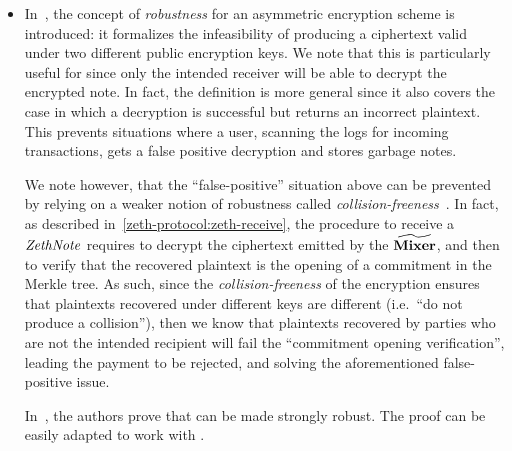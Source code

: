 \begin{itemize}
    \item In~\cite{abdalla2010robust}, the concept of \emph{robustness} for an asymmetric encryption scheme is introduced: it formalizes the infeasibility of producing a ciphertext valid under two different public encryption keys. We note that this is particularly useful for \zeth{} since only the intended receiver will be able to decrypt the encrypted note. In fact, the definition is more general since it also covers the case in which a decryption is successful but returns an incorrect plaintext. This prevents situations where a user, scanning the \mixer{} logs for incoming transactions, gets a false positive decryption and stores garbage notes.
    \begin{notebox}
        We note however, that the ``false-positive'' situation above can be prevented by relying on a weaker notion of robustness called \emph{collision-freeness}~\cite{asiacrypt-2010-23840}. In fact, as described in~\cref{zeth-protocol:zeth-receive}, the procedure to receive a $\mathit{ZethNote}$ requires to decrypt the ciphertext emitted by the $\widetilde{\mathbf{Mixer}}$, and then to verify that the recovered plaintext is the opening of a commitment in the Merkle tree.
        As such, since the \emph{collision-freeness} of the encryption ensures that plaintexts recovered under different keys are different (i.e.~``do not produce a collision''), then we know that plaintexts recovered by parties who are not the intended recipient will fail the ``commitment opening verification'', leading the payment to be rejected, and solving the aforementioned false-positive issue.
    \end{notebox}
In~\cite[Section 6]{abdalla2010robust}, the authors prove that \dhies{} can be made strongly robust. The proof can be easily adapted to work with \dhaes{}.

\end{itemize}

